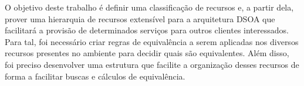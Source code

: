 O objetivo deste trabalho é definir uma classificação de recursos e, a partir dela, prover uma hierarquia de recursos extensível para a arquitetura DSOA que facilitará a provisão de determinados serviços para outros clientes interessados. Para tal, foi necessário criar regras de equivalência a serem aplicadas nos diversos recursos presentes no ambiente para decidir quais são equivalentes. Além disso, foi preciso desenvolver uma estrutura que facilite a organização desses recursos de forma a facilitar buscas e cálculos de equivalência.

